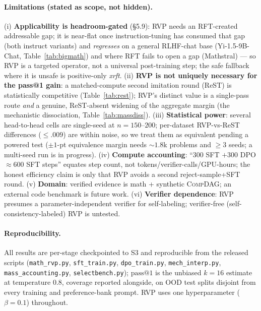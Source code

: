 \paragraph{Limitations (stated as scope, not hidden).}
(i) \textbf{Applicability is headroom-gated} (\S5.9): RVP needs an RFT-created addressable gap; it is
near-flat once instruction-tuning has consumed that gap (both instruct variants) and \emph{regresses} on
a general RLHF-chat base (Yi-1.5-9B-Chat, Table~\ref{tab:bigmath}) and where RFT fails to open a gap
(Mathstral) --- so RVP is a targeted operator, not a universal post-training step; the safe fallback where
it is unsafe is positive-only \emph{xrft}. (ii) \textbf{RVP is not uniquely necessary for the pass@1 gain}:
a matched-compute second imitation round (ReST) is statistically competitive (Table~\ref{tab:rest}); RVP's
distinct value is a single-pass route \emph{and} a genuine, ReST-absent widening of the aggregate margin
(the mechanistic dissociation, Table~\ref{tab:massdiss}). (iii) \textbf{Statistical power}: several
head-to-head cells are single-seed at $n{=}150$--$200$; per-dataset RVP-vs-ReST differences ($\le.009$) are
within noise, so we treat them as equivalent pending a powered test ($\pm1$-pt equivalence margin needs
$\sim\!1.8$k problems and $\ge\!3$ seeds; a multi-seed run is in progress). (iv) \textbf{Compute accounting}:
``$300$ SFT $+300$ DPO $\approx\!600$ SFT steps'' equates step count, not tokens/verifier-calls/GPU-hours;
the honest efficiency claim is only that RVP avoids a second reject-sample+SFT round. (v) \textbf{Domain}:
verified evidence is math + synthetic \textsc{CompDAG}; an external code benchmark is future work. (vi)
\textbf{Verifier dependence}: RVP presumes a parameter-independent verifier for self-labeling; verifier-free
(self-consistency-labeled) RVP is untested.

\paragraph{Reproducibility.}
All results are per-stage checkpointed to S3 and reproducible from the released scripts
(\texttt{math\_rvp.py}, \texttt{sft\_train.py}, \texttt{dpo\_train.py}, \texttt{mech\_interp.py},
\texttt{mass\_accounting.py}, \texttt{selectbench.py}); $\text{pass}@1$ is the unbiased $k{=}16$ estimate at
temperature $0.8$, coverage reported alongside, on OOD test splits disjoint from every training and
preference-bank prompt. RVP uses one hyperparameter ($\beta{=}0.1$) throughout.
